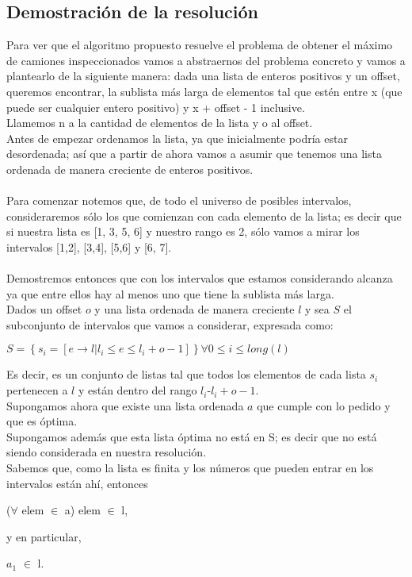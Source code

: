 \subsection{Demostraci\'on de la resoluci\'on}

Para ver que el algoritmo propuesto resuelve el problema de obtener el m\'aximo de camiones inspeccionados vamos a abstraernos del problema concreto y vamos a plantearlo de la siguiente manera: dada una lista de enteros positivos y un offset, queremos encontrar, la sublista m\'as larga de elementos tal que est\'en entre x (que puede ser cualquier entero positivo) y x + offset - 1 inclusive.\\

Llamemos n a la cantidad de elementos de la lista y o al offset.\\
Antes de empezar ordenamos la lista, ya que inicialmente podr\'ia estar desordenada; as\'i que a partir de ahora vamos a asumir que tenemos una lista ordenada de manera creciente de enteros positivos. \\ \\

Para comenzar notemos que, de todo el universo de posibles intervalos, consideraremos s\'olo los que comienzan con cada elemento de la lista; es decir que si nuestra lista es [1, 3, 5, 6] y nuestro rango es 2, s\'olo vamos a mirar los intervalos [1,2], [3,4], [5,6] y [6, 7].\\ \\

Demostremos entonces que con los intervalos que estamos considerando alcanza ya que entre ellos hay al menos uno que tiene la sublista m\'as larga.\\
Dados un offset $o$ y una lista ordenada de manera creciente $l$ y sea $S$ el subconjunto de intervalos que vamos a considerar, expresada como: \\
\begin{center}
$ S = \left\lbrace s_i = \left[ e \rightarrow l | l_i \leq e \leq l_i + o - 1 \right] \right\rbrace \forall 0 \leq i \leq long(l) $ 
\end{center}
Es decir, es un conjunto de listas tal que todos los elementos de cada lista $s_i$ pertenecen a $l$ y est\'an dentro del rango $l_i$-$l_i + o - 1$. \\
Supongamos ahora que existe una lista ordenada $a$ que cumple con lo pedido y que es \'optima.\\
Supongamos adem\'as que esta lista \'optima no est\'a en S; es decir que no est\'a siendo considerada en nuestra resoluci\'on.\\
Sabemos que, como la lista es finita y los n\'umeros que pueden entrar en los intervalos est\'an ah\'i, entonces \\
\begin{center}
($\forall$ elem $\in$ a) elem $\in$ l, \\
\end{center}
y en particular, \\
\begin{center}
$a_1$ $\in$ l. \\
\end{center}

